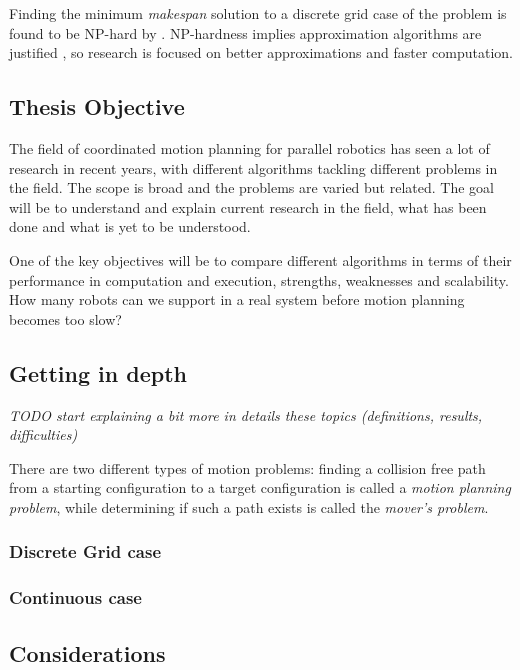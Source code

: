 Finding the minimum \emph{makespan}  solution to a discrete grid case of the problem is found to be NP-hard by \cite{demaineCoordinatedMotionPlanning2019}.
NP-hardness implies approximation algorithms are justified \cite{demaineCoordinatedMotionPlanning2019}, so research is focused on better approximations and faster computation. 

\subsection{Thesis Objective}

The field of coordinated motion planning for parallel robotics has seen a lot of research in recent years, with different algorithms tackling different problems in the field. 
The scope is broad and the problems are varied but related. 
The goal will be  to understand and explain current research in the field, what has been done and what is yet to be understood.

One of the key objectives will be  to compare different algorithms in terms of their performance in computation and execution, strengths, weaknesses and scalability. How many robots can we support in a real system before motion planning becomes too slow? 

\subsection{Getting in depth}

\emph{TODO start explaining a bit more in details these topics (definitions, results, difficulties)}

There are two different types of motion problems: finding a collision free path from a starting configuration to a target configuration is called a \emph{motion planning problem}, while determining if such a path exists is called the \emph{mover's problem}. \cite{hopcroftReducingMultipleObject1986} 


\subsubsection{Discrete Grid case}



\subsubsection{Continuous case}


\subsection{Considerations}